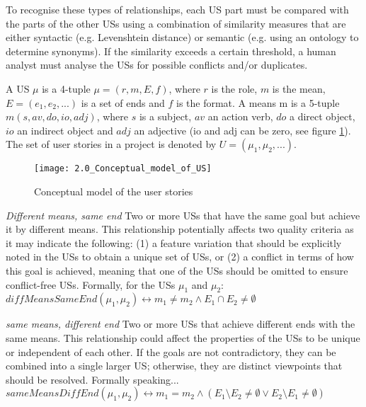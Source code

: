 To recognise these types of relationships, each US part must be compared with the parts of the other USs using a combination of similarity measures that are either syntactic (e.g. Levenshtein distance) or semantic (e.g. using an ontology to determine synonyms). If the similarity exceeds a certain threshold, a human analyst must analyse the USs for possible conflicts and/or duplicates.
\begin{definition}
A US $\mu$ is a 4-tuple $\mu=(r,m,E,f)$, where $r$ is the role, $m$ is the mean, $E=(e_1, e_2, . . .)$ is a set of ends and $f$ is the format. A means m is a 5-tuple $m (s,av,do,io,adj)$, where $s$ is a subject, $av$ an action verb, $do$ a direct object, $io$ an indirect object and $adj$ an adjective (io and adj can be zero, see figure \ref{fig:conceptual_model}). The set of user stories in a project is denoted by $U=(\mu_1, \mu_2, . . .)$.
\end{definition}
\begin{figure}
\center
\texttt{[image: 2.0\_Conceptual\_model\_of\_US]}
\caption{Conceptual model of the user stories \cite{lucassen2016improving}}\label{fig:conceptual_model}
\end{figure}
\begin{definition}
\emph{Different means, same end }Two or more USs that have the same goal but achieve it by different means. This relationship potentially affects two quality criteria as it may indicate the following: (1) a feature variation that should be explicitly noted in the USs to obtain a unique set of USs, or (2) a conflict in terms of how this goal is achieved, meaning that one of the USs should be omitted to ensure conflict-free USs. Formally, for the USs $\mu_1$ and $\mu_2$:\\ 
$diffMeansSameEnd(\mu_1,\mu_2)\leftrightarrow m_1 \neq m_2 \wedge E_1 \cap E_2 \neq \emptyset$
\end{definition}
\begin{definition}
\emph{same means, different end} Two or more USs that achieve different ends with the same means. This relationship could affect the properties of the USs to be unique or independent of each other. If the goals are not contradictory, they can be combined into a single larger US; otherwise, they are distinct viewpoints that should be resolved. Formally speaking... 
$sameMeansDiffEnd(\mu_1, \mu_2) \leftrightarrow m_1 = m_2 \wedge (E_1 \setminus E_2 \neq \emptyset \vee E_2 \setminus E_1 \neq \emptyset )$
\end{definition}

